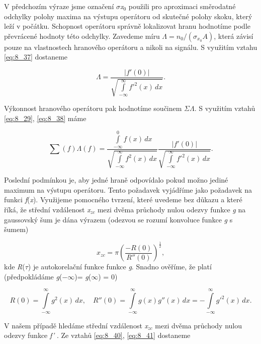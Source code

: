 V předchozím výraze jsme označení $\sigma$\textit{x}$_0$ použili pro aproximaci směrodatné odchylky polohy maxima na výstupu operátoru od skutečné polohy skoku, který leží v počátku. Schopnost operátoru správně lokalizovat hranu hodnotíme podle převrácené hodnoty této odchylky. Zavedeme míru $\Lambda = n_0/(\sigma_{x_0} A)$, která závisí pouze na vlastnostech hranového operátoru a nikoli na signálu. S využitím vztahu \eqref{eq:8_37} dostaneme

\begin{equation} \label{eq:8_38}
    \Lambda = \frac{|f'(0)|}{\sqrt{\int\limits_{-\infty}^{\infty} f'^2(x)\,dx}} .
\end{equation}

Výkonnost hranového operátoru pak hodnotíme součinem $\Sigma\Lambda$. S využitím vztahů \eqref{eq:8_29}, \eqref{eq:8_38} máme

\begin{equation} \label{eq:8_39}
    \sum(f)\Lambda(f) = \frac{\int\limits_{-\infty}^{0} f(x)\,dx}{\sqrt{\int\limits_{-\infty}^{\infty} f^2(x)\,dx}} \frac{|f'(0)|}{\sqrt{\int\limits_{-\infty}^{\infty} f'^2(x)\,dx}} .
\end{equation}

Poslední podmínkou je, aby jedné hraně odpovídalo pokud možno jediné maximum na výstupu operátoru. Tento požadavek vyjádříme jako požadavek na funkci \textit{f}(\textit{x}). Využijeme pomocného tvrzení, které uvedeme bez důkazu a které říká, že střední vzdálenost \textit{x}$_{zc}$ mezi dvěma průchody nulou odezvy funkce \textit{g} na gaussovský šum je dána výrazem (odezvou se rozumí konvoluce funkce \textit{g} s šumem) 

\begin{equation} \label{eq:8_40}
    x_{zc} = \pi \left( \frac{-R(0)}{R''(0)} \right)^{\frac{1}{2}},
\end{equation}
kde \textit{R}($\tau$) je autokorelační funkce funkce \textit{g}. Snadno ověříme, že platí (předpokládáme \textit{g}($-$$\infty$)= \textit{g}($\infty$) = 0)

\begin{equation} \label{eq:8_41}
    R(0) = \int\limits_{-\infty}^{\infty} g^2(x)\,dx, \quad R''(0) = \int\limits_{-\infty}^{\infty} g(x) g''(x)\,dx = - \int\limits_{-\infty}^{\infty} g'^2(x)\,dx .
\end{equation}

V našem případě hledáme střední vzdálenost \textit{x}$_{zc}$ mezi dvěma průchody nulou odezvy funkce \textit{f'} . Ze vztahů \eqref{eq:8_40}, \eqref{eq:8_41} dostaneme

